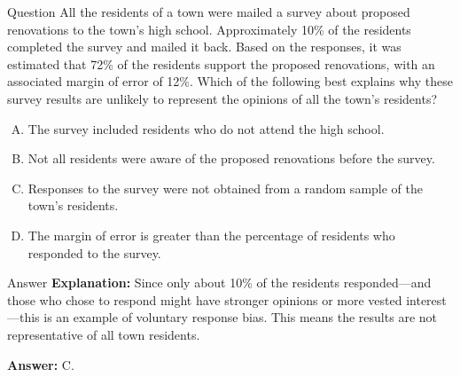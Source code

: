 \documentclass{beamer}
\begin{document}
\begin{frame}{Question}
All the residents of a town were mailed a survey about proposed renovations to the town’s high school. Approximately 10\% of the residents completed the survey and mailed it back. Based on the responses, it was estimated that 72\% of the residents support the proposed renovations, with an associated margin of error of 12\%. Which of the following best explains why these survey results are unlikely to represent the opinions of all the town’s residents?

\begin{enumerate}[A.]
    \item The survey included residents who do not attend the high school.
    \item Not all residents were aware of the proposed renovations before the survey.
    \item Responses to the survey were not obtained from a random sample of the town’s residents.
    \item The margin of error is greater than the percentage of residents who responded to the survey.
\end{enumerate}
\end{frame}



\begin{frame}{Answer}
\textbf{Explanation:}  
Since only about 10\% of the residents responded—and those who chose to respond might have stronger opinions or more vested interest—this is an example of voluntary response bias. This means the results are not representative of all town residents.

\textbf{Answer:} C.
\end{frame}
\end{document}

